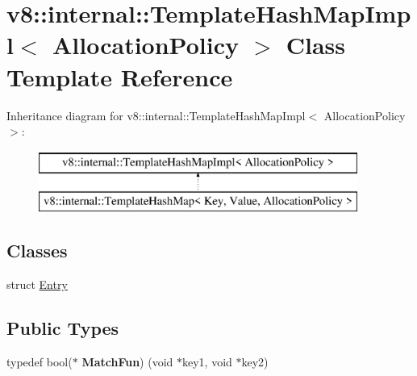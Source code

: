 \hypertarget{classv8_1_1internal_1_1_template_hash_map_impl}{}\section{v8\+:\+:internal\+:\+:Template\+Hash\+Map\+Impl$<$ Allocation\+Policy $>$ Class Template Reference}
\label{classv8_1_1internal_1_1_template_hash_map_impl}
Inheritance diagram for v8\+:\+:internal\+:\+:Template\+Hash\+Map\+Impl$<$ Allocation\+Policy $>$\+:\begin{figure}[H]
\begin{center}
\leavevmode
\includegraphics[height=2.000000cm]{classv8_1_1internal_1_1_template_hash_map_impl}
\end{center}
\end{figure}
\subsection*{Classes}
\begin{DoxyCompactItemize}
\item 
struct \hyperlink{structv8_1_1internal_1_1_template_hash_map_impl_1_1_entry}{Entry}
\end{DoxyCompactItemize}
\subsection*{Public Types}
\begin{DoxyCompactItemize}
\item 
\hypertarget{classv8_1_1internal_1_1_template_hash_map_impl_a72f31025c87628f7236ecec4ff485062}{}typedef bool($\ast$ {\bfseries Match\+Fun}) (void $\ast$key1, void $\ast$key2)\label{classv8_1_1internal_1_1_template_hash_map_impl_a72f31025c87628f7236ecec4ff485062}

\end{DoxyCompactItemize}
